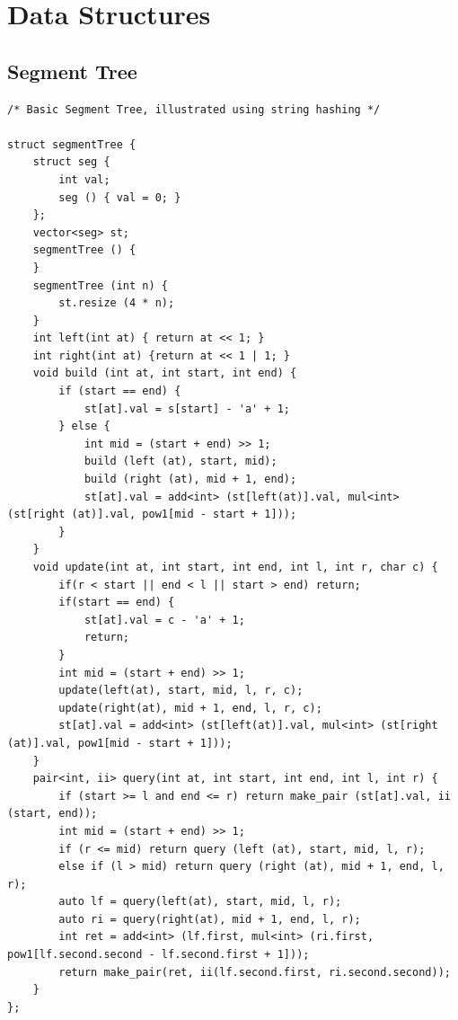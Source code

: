 \documentclass[8pt, a4paper, oneside, twocolumn]{extarticle}
\begin{document}
\section{Data Structures}
\subsection{Segment Tree}

\begin{verbatim}
/* Basic Segment Tree, illustrated using string hashing */

struct segmentTree {
    struct seg {
        int val;
        seg () { val = 0; }
    };
    vector<seg> st;
    segmentTree () {
    }
    segmentTree (int n) {
        st.resize (4 * n);
    }
    int left(int at) { return at << 1; }
    int right(int at) {return at << 1 | 1; }
    void build (int at, int start, int end) {
        if (start == end) {
            st[at].val = s[start] - 'a' + 1;
        } else {
            int mid = (start + end) >> 1;
            build (left (at), start, mid);
            build (right (at), mid + 1, end);
            st[at].val = add<int> (st[left(at)].val, mul<int> (st[right (at)].val, pow1[mid - start + 1]));
        }
    }
    void update(int at, int start, int end, int l, int r, char c) {
        if(r < start || end < l || start > end) return;
        if(start == end) {
            st[at].val = c - 'a' + 1;
            return;
        }
        int mid = (start + end) >> 1;
        update(left(at), start, mid, l, r, c);
        update(right(at), mid + 1, end, l, r, c);
        st[at].val = add<int> (st[left(at)].val, mul<int> (st[right (at)].val, pow1[mid - start + 1]));
    }
    pair<int, ii> query(int at, int start, int end, int l, int r) {
        if (start >= l and end <= r) return make_pair (st[at].val, ii (start, end));
        int mid = (start + end) >> 1;
        if (r <= mid) return query (left (at), start, mid, l, r);
        else if (l > mid) return query (right (at), mid + 1, end, l, r);
        auto lf = query(left(at), start, mid, l, r);
        auto ri = query(right(at), mid + 1, end, l, r);
        int ret = add<int> (lf.first, mul<int> (ri.first, pow1[lf.second.second - lf.second.first + 1]));
        return make_pair(ret, ii(lf.second.first, ri.second.second));
    }
};
\end{verbatim}
\end{document}
